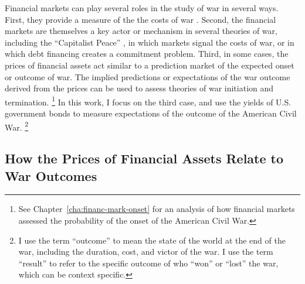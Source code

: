 Financial markets can play several roles in the study of war in several ways.
First, they provide a measure of the the costs of war \parencites{SchneiderTroeger2006}{GuidolinLaFerrara2010}.
Second, the financial markets are themselves a key actor or mechanism in several theories of war, including the ``Capitalist Peace'' \parencites{Gartzke2007}{DafoeKelsey2014a}, in which markets signal the costs of war, or \textcite{Slantchev2012a} in which debt financing creates a commitment problem.
Third, in some cases, the prices of financial assets act similar to a prediction market of the expected onset or outcome of war.
The implied predictions or expectations of the war outcome derived from the prices can be used to assess theories of war initiation and termination.%
\footnote{See Chapter~\ref{cha:financ-mark-onset} for an analysis of how financial markets assessed the probability of the onset of the American Civil War.}
In this work, I focus on the third case, and use the yields of U.S. government bonds to measure expectations of the outcome of the American Civil War.%
\footnote{
  I use the term ``outcome'' to mean the state of the world at the end of the war, including the duration, cost, and victor of the war.
  I use the term ``result'' to refer to the specific outcome of who ``won'' or ``lost'' the war, which can be context specific.
}

\subsection{How the Prices of Financial Assets Relate to War Outcomes}
\label{sec:how-prices-financial}

